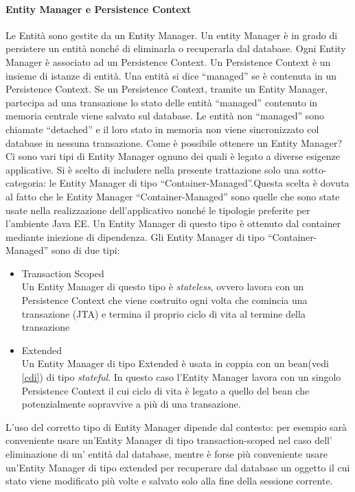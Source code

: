 \paragraph{Entity Manager e Persistence Context}
Le Entità sono gestite da un Entity Manager. Un entity Manager è in grado di persistere un entità nonché di eliminarla o recuperarla dal database. Ogni Entity Manager è associato ad un Persistence Context. Un Persistence Context è un insieme di
istanze di entità. Una entità si dice ``managed'' se è contenuta in un Persistence Context. Se un Persistence Context, tramite un Entity Manager, partecipa ad una transazione lo stato delle entità ``managed'' contenuto in memoria
centrale viene salvato sul database. Le entità non ``managed'' sono chiamate ``detached'' e il loro stato in memoria non viene sincronizzato col database in nessuna transazione. Come è possibile ottenere un Entity Manager? Ci sono vari tipi
di Entity Manager ognuno dei quali è legato a diverse esigenze applicative. Si è scelto di includere nella presente trattazione solo una sotto-categoria: le Entity Manager di tipo ``Container-Managed''.Questa scelta è dovuta al fatto che
le Entity Manager ``Container-Managed'' sono quelle che sono state usate nella realizzazione dell'applicativo nonché le tipologie preferite per l'ambiente Java EE. Un Entity Manager di questo tipo è ottenuto dal container mediante iniezione
di dipendenza. Gli Entity Manager di tipo ``Container-Managed'' sono di due tipi:

\begin{itemize}
 \item Transaction Scoped\\
 Un Entity Manager di questo tipo è \textsl{stateless}, ovvero lavora con un Persistence Context che viene costruito ogni volta che comincia una transazione (JTA) e termina il proprio ciclo di vita al termine della transazione
 \item Extended\\
  Un Entity Manager di tipo Extended è usata in coppia con un bean(vedi \ref{cdi}) di tipo \textsl{stateful}. In questo caso l'Entity Manager lavora con un singolo Persistence Context il cui ciclo di vita è legato a quello del bean che potenzialmente sopravvive
  a più di una transazione.
\end{itemize}

L'uso del corretto tipo di Entity Manager dipende dal contesto: per esempio sarà conveniente usare un'Entity Manager di tipo transaction-scoped nel caso dell' eliminazione di un' entità dal database, mentre è forse più conveniente usare un'Entity
Manager di tipo extended per recuperare dal database un oggetto il cui stato viene modificato più volte e salvato solo alla fine della sessione corrente.


